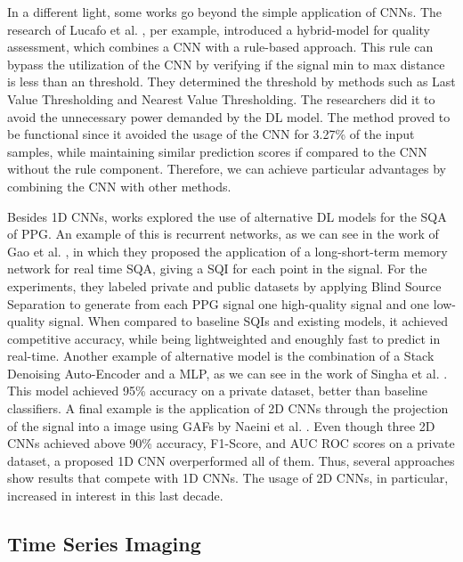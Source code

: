 In a different light, some works go beyond the simple application of \gls{CNN}s. The research of Lucafo et al. \cite{deep-learning-3}, per example, introduced a hybrid-model for quality assessment, which combines a \gls{CNN} with a rule-based approach. This rule can bypass the utilization of the \gls{CNN} by verifying if the signal min to max distance is less than an threshold. They determined the threshold by methods such as Last Value Thresholding and Nearest Value Thresholding. The researchers did it to avoid the unnecessary power demanded by the \gls{DL} model. The method proved to be functional since it avoided the usage of the \gls{CNN} for 3.27\% of the input samples, while maintaining similar prediction scores if compared to the \gls{CNN} without the rule component. Therefore, we can achieve particular advantages by combining the \gls{CNN} with other methods.  

Besides 1D \gls{CNN}s, works explored the use of alternative \gls{DL} models for the \gls{SQA} of \gls{PPG}. An example of this is recurrent networks, as we can see in the work of Gao et al. \cite{deep-learning-4}, in which they proposed the application of a long-short-term memory network for real time \gls{SQA}, giving a \gls{SQI} for each point in the signal. For the experiments, they labeled private and public datasets by applying Blind Source Separation to generate from each \gls{PPG} signal one high-quality signal and one low-quality signal. When compared to baseline \gls{SQI}s and existing models, it achieved competitive accuracy, while being lightweighted and enoughly fast to predict in real-time. Another example of alternative model is the combination of a Stack Denoising Auto-Encoder and a \gls{MLP}, as we can see in the work of Singha et al. \cite{deep-learning-5}. This model achieved 95\% accuracy on a private dataset, better than baseline classifiers. A final example is the application of 2D \glspl{CNN} through the projection of the signal into a image using \glspl{GAF} by Naeini et al. \cite{deep-learning-6}. Even though three 2D \glspl{CNN} achieved above 90\% accuracy, F1-Score, and \gls{AUC} \gls{ROC} scores on a private dataset, a proposed 1D \gls{CNN} overperformed all of them. Thus, several approaches show results that compete with 1D \glspl{CNN}. The usage of 2D \glspl{CNN}, in particular, increased in interest in this last decade.




\subsection{Time Series Imaging}
\label{sec:imaging}

